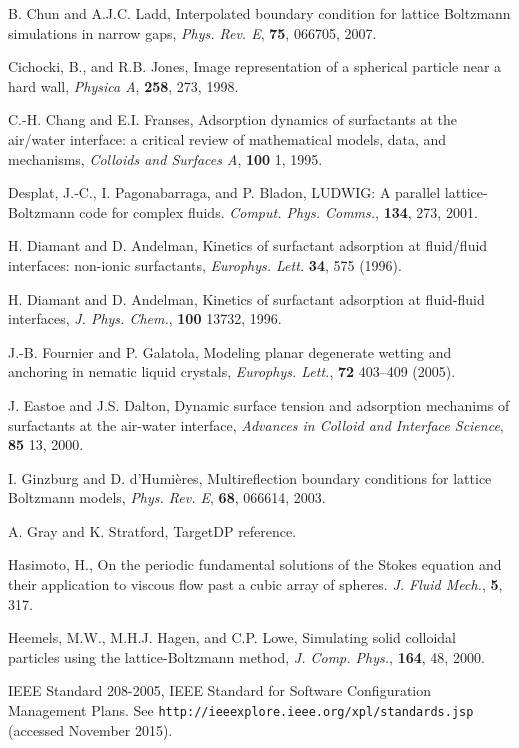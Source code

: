 \begin{thebibliography}{99}
B. Chun and A.J.C. Ladd,
Interpolated boundary condition for lattice Boltzmann simulations in
narrow gaps,
\textit{Phys. Rev. E}, \textbf{75}, 066705, 2007.

Cichocki, B., and R.B. Jones,
Image representation of a spherical particle near a hard wall,
\textit{Physica A}, \textbf{258}, 273, 1998.

C.-H. Chang and E.I. Franses,
Adsorption dynamics of surfactants at the air/water interface:
a critical review of mathematical models, data, and mechanisms,
\textit{Colloids and Surfaces A}, \textbf{100} 1, 1995.

Desplat, J.-C., I. Pagonabarraga, and P. Bladon,
LUDWIG: A parallel lattice-Boltzmann code for complex fluids.
\textit{Comput. Phys. Comms.}, \textbf{134}, 273, 2001.

H. Diamant and D. Andelman,
Kinetics of surfactant adsorption at fluid/fluid
interfaces: non-ionic surfactants,
\textit{Europhys. Lett.} \textbf{34}, 575 (1996).

H. Diamant and D. Andelman,
Kinetics of surfactant adsorption at fluid-fluid interfaces,
\textit{J. Phys. Chem.}, \textbf{100} 13732, 1996.

J.-B. Fournier and P. Galatola,
Modeling planar degenerate wetting and anchoring in nematic liquid
crystals,
\textit{Europhys. Lett.}, \textbf{72} 403--409 (2005).

J. Eastoe and J.S. Dalton,
Dynamic surface tension and adsorption mechanims of surfactants
at the air-water interface,
\textit{Advances in Colloid and Interface Science}, \textbf{85}
13, 2000.

I. Ginzburg and D. d'Humi\`eres,
Multireflection boundary conditions for lattice Boltzmann models,
\textit{Phys. Rev. E}, \textbf{68}, 066614, 2003.

A. Gray and K. Stratford,
TargetDP reference.

Hasimoto, H., On the periodic fundamental solutions of the Stokes
equation and their application to viscous flow past a cubic array
of spheres.
\textit{J. Fluid Mech.}, \textbf{5}, 317.

Heemels, M.W., M.H.J. Hagen, and C.P. Lowe, Simulating solid colloidal
particles using the lattice-Boltzmann method,
\textit{J. Comp. Phys.}, \textbf{164}, 48, 2000.

IEEE Standard 208-2005, IEEE Standard for Software Configuration Management
Plans.
See \texttt{http://ieeexplore.ieee.org/xpl/standards.jsp}
(accessed November 2015).


\end{thebibliography}
